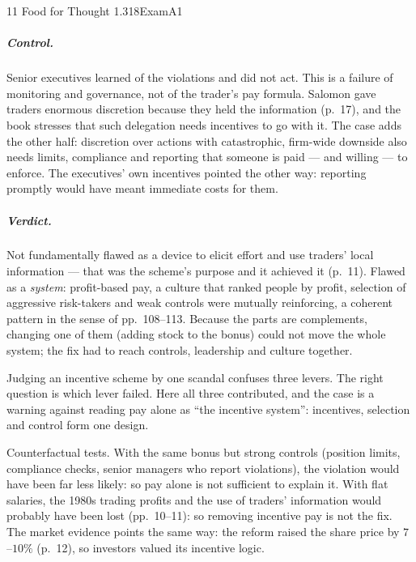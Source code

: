\begin{exsol}{11}{\MR{} Food for Thought 1.3}{18}{Exam}{A1}
\subparagraph{Control.} Senior executives learned of the violations and did not act. This is a
failure of monitoring and governance, not of the trader's pay formula. Salomon gave traders
enormous discretion because they held the information (p.~17), and the book stresses that such
delegation needs incentives to go with it. The case adds the other half: discretion over actions
with catastrophic, firm-wide downside also needs limits, compliance and reporting that someone is
paid --- and willing --- to enforce. The executives' own incentives pointed the other way:
reporting promptly would have meant immediate costs for them.

\subparagraph{Verdict.} Not fundamentally flawed as a device to elicit effort and use traders'
local information --- that was the scheme's purpose and it achieved it (p.~11). Flawed as a
\emph{system}: profit-based pay, a culture that ranked people by profit, selection of aggressive
risk-takers and weak controls were mutually reinforcing, a coherent pattern in the sense of
pp.~108--113. Because the parts are complements, changing one of them (adding stock to the bonus)
could not move the whole system; the fix had to reach controls, leadership and culture together.

\interp Judging an incentive scheme by one scandal confuses three levers. The right question is
which lever failed. Here all three contributed, and the case is a warning against reading pay
alone as ``the incentive system'': incentives, selection and control form one design.

\verify Counterfactual tests. With the same bonus but strong controls (position limits, compliance
checks, senior managers who report violations), the violation would have been far less likely: so
pay alone is not sufficient to explain it. With flat salaries, the 1980s trading profits and the
use of traders' information would probably have been lost (pp.~10--11): so removing incentive pay
is not the fix. The market evidence points the same way: the reform raised the share price by
$7$--$10\%$ (p.~12), so investors valued its incentive logic.

\end{exsol}

